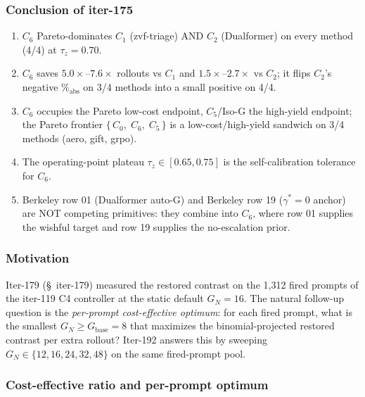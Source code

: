 \documentclass{article}
\begin{document}
\subsubsection*{Conclusion of iter-175}

\begin{enumerate}
\item $C_6$ Pareto-dominates $C_1$ (zvf-triage) AND $C_2$ (Dualformer)
      on every method (4/4) at $\tau_z = 0.70$.
\item $C_6$ saves $5.0\times$--$7.6\times$ rollouts vs $C_1$ and
      $1.5\times$--$2.7\times$ vs $C_2$; it flips $C_2$'s negative
      $\%_{\mathrm{abs}}$ on 3/4 methods into a small positive on 4/4.
\item $C_6$ occupies the Pareto low-cost endpoint, $C_5$/Iso-G the
      high-yield endpoint; the Pareto frontier $\{\,C_0,\; C_6,\; C_5\,\}$
      is a low-cost/high-yield sandwich on 3/4 methods (aero, gift, grpo).
\item The operating-point plateau $\tau_z \in [0.65, 0.75]$ is
      the self-calibration tolerance for $C_6$.
\item Berkeley row 01 (Dualformer auto-G) and Berkeley row 19
      ($\gamma^*{=}0$ anchor) are NOT competing primitives: they
      combine into $C_6$, where row 01 supplies the wishful target
      and row 19 supplies the no-escalation prior.
\end{enumerate}
 

\subsubsection*{Motivation}

Iter-179 (\S~iter-179) measured the restored contrast on the 1,312 fired
prompts of the iter-119 C4 controller at the static default
$G_N{=}16$. The natural follow-up question is the \emph{per-prompt
cost-effective optimum}: for each fired prompt, what is the smallest
$G_N \ge G_{\mathrm{base}}{=}8$ that maximizes the binomial-projected
restored contrast per extra rollout? Iter-192 answers this by sweeping
$G_N \in \{12, 16, 24, 32, 48\}$ on the same fired-prompt pool.

\subsubsection*{Cost-effective ratio and per-prompt optimum}
\end{document}
